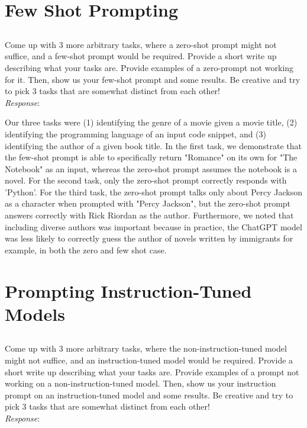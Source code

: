 \documentclass{article}
\begin{document}
\section{Few Shot Prompting}
\setcounter{subsection}{2}
\subsection{}
Come up with 3 more arbitrary tasks, where a zero-shot prompt might not suffice, and a few-shot prompt would be required. Provide a short write up describing what your tasks are. Provide examples of a zero-prompt not working for it. Then, show us your few-shot prompt and some results. Be creative and try to pick 3 tasks that are somewhat distinct from each other!\\
\emph{Response}: 

Our three tasks were (1) identifying the genre of a movie given a movie title, (2) identifying the programming language of an input code snippet, and (3) identifying the author of a given book title. In the first task, we demonstrate that the few-shot prompt is able to specifically return "Romance" on its own for "The Notebook" as an input, whereas the zero-shot prompt assumes the notebook is a novel. For the second task, only the zero-shot prompt correctly responds with 'Python'. For the third task, the zero-shot prompt talks only about Percy Jackson as a character when prompted with "Percy Jackson", but the zero-shot prompt answers correctly with Rick Riordan as the author. Furthermore, we noted that including diverse authors was important because in practice, the ChatGPT model was less likely to correctly guess the author of novels written by immigrants for example, in both the zero and few shot case. 


\section{Prompting Instruction-Tuned Models}
\setcounter{subsection}{1}
\subsection{}
Come up with 3 more arbitrary tasks, where the non-instruction-tuned model might not suffice, and an instruction-tuned model would be required. Provide a short write up describing what your tasks are. Provide examples of a prompt not working on a non-instruction-tuned model. Then, show us your instruction prompt on an instruction-tuned model and some results. Be creative and try to pick 3 tasks that are somewhat distinct from each other!
\\ \emph{Response}:
\end{document}
